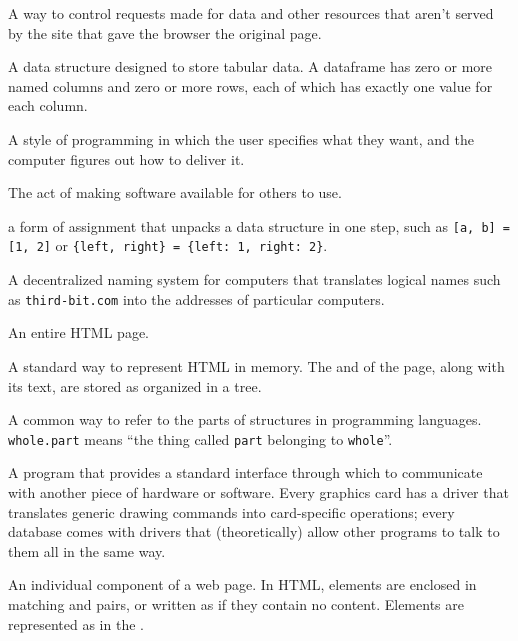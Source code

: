 \begin{description}
A way to control requests made for data and other resources that aren't served
by the site that gave the browser the original page.

A data structure designed to store tabular data.
A dataframe has zero or more named columns
and zero or more rows,
each of which has exactly one value for each column.

A style of programming in which the user specifies what they want, and the
computer figures out how to deliver it.

The act of making software available for others to use.

a form of assignment that unpacks a data structure in one step,
such as \texttt{[a,\ b] = [1,\ 2]} or \texttt{\{left,\ right\} = \{left:\ 1,\ right:\ 2\}}.

A decentralized naming system for computers that translates logical names such
as \texttt{third-bit.com} into the addresses of particular computers.

An entire HTML page.

A standard way to represent HTML in memory. The  and
 of the page, along with its text, are stored as
 organized in a tree.

A common way to refer to the parts of structures in programming languages.
\texttt{whole.part} means ``the thing called \texttt{part} belonging to \texttt{whole}''.

A program that provides a standard interface through which to communicate with
another piece of hardware or software. Every graphics card has a driver that
translates generic drawing commands into card-specific operations; every
database comes with drivers that (theoretically) allow other programs to talk
to them all in the same way.

An individual component of a web page. In HTML, elements are enclosed in
matching \texttt{} and \texttt{} pairs,
or written as \texttt{} if they contain no content.
Elements are represented as  in the .


\end{description}
